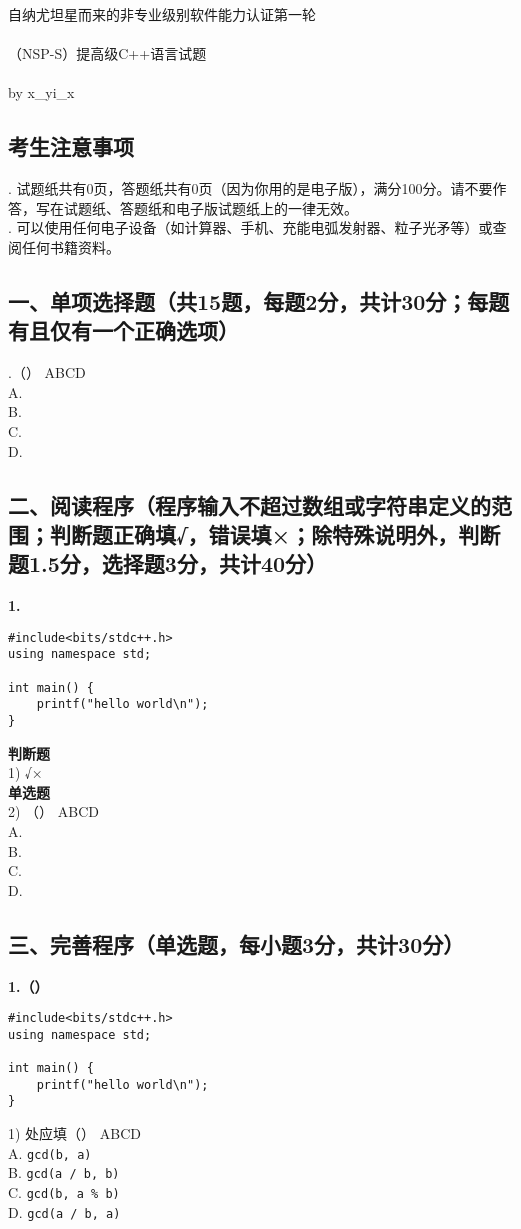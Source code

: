 \documentclass[UTF8]{ctexart}
\begin{document}
	\begin{center}
		{\huge 自纳尤坦星而来的非专业级别软件能力认证第一轮}\\~\\{\huge（NSP-S）提高级C++语言试题}\\~\\
		\large by x\_yi\_x
	\end{center}
	\large
	\subsection*{考生注意事项}
	. 试题纸共有0页，答题纸共有0页（因为你用的是电子版），满分100分。请不要作答，写在试题纸、答题纸和电子版试题纸上的一律无效。\\
	. 可以使用任何电子设备（如计算器、手机、充能电弧发射器、粒子光矛等）或查阅任何书籍资料。
	
	\subsection*{一、单项选择题（共15题，每题2分，共计30分；每题有且仅有一个正确选项）}
	.（\quad）{\color{red} ABCD}\\
	A. \\
	B. \\
	C. \\
	D. \\
	\subsection*{二、阅读程序（程序输入不超过数组或字符串定义的范围；判断题正确填√，错误填×；除特殊说明外，判断题1.5分，选择题3分，共计40分）}
	\noindent\textbf{1.}
	\begin{lstlisting}
#include<bits/stdc++.h>
using namespace std;

int main() {
    printf("hello world\n");
}
	\end{lstlisting}
	\textbf{判断题}\\
	1) {\color{red}√×}\\
	\textbf{单选题}\\
	2) （\quad）{\color{red} ABCD}\\
	A. \\
	B. \\
	C. \\
	D. \\
	\subsection*{三、完善程序（单选题，每小题3分，共计30分）}
	\noindent \textbf{1.（）}
	\begin{lstlisting}
#include<bits/stdc++.h>
using namespace std;

int main() {
    printf("hello world\n");
}
	\end{lstlisting}
	1) 处应填（\quad）{\color{red} ABCD}\\
	A. \texttt{gcd(b, a)}\\
	B. \texttt{gcd(a / b, b)}\\
	C. \texttt{gcd(b, a \% b)}\\
	D. \texttt{gcd(a / b, a)}\\
\end{document}
